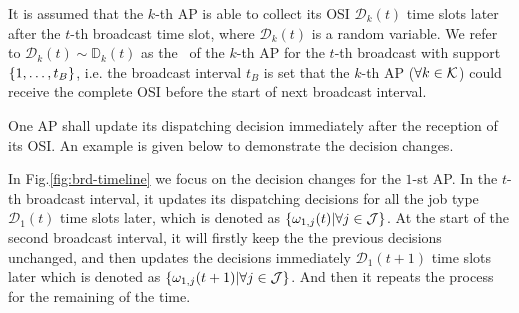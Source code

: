 It is assumed that the $k$-th AP is able to collect its OSI $\mathcal{D}_{k}(t)$ time slots later after the $t$-th broadcast time slot, where $\mathcal{D}_{k}(t)$ is a random variable.
We refer to $\mathcal{D}_{k}(t) \sim \mathbb{D}_{k}(t)$ as the \brlatency~of the $k$-th AP for the $t$-th broadcast with support $\{1,\dots,t_B\}$, i.e. the broadcast interval $t_B$ is set that the $k$-th AP ($\forall k\in\mathcal{K}$) could receive the complete OSI before the start of next broadcast interval.

One AP shall update its dispatching decision immediately after the reception of its OSI.
An example is given below to demonstrate the decision changes.
\begin{example}
    In Fig.\ref{fig:brd-timeline} we focus on the decision changes for the $1$-st AP.
    In the $t$-th broadcast interval, it updates its dispatching decisions for all the job type $\mathcal{D}_{1}(t)$ time slots later, which is denoted as $\{\omega_{1,j}(t) | \forall j\in\mathcal{J}\}$.
    At the start of the second broadcast interval, it will firstly keep the the previous decisions unchanged, and then updates the decisions immediately $\mathcal{D}_{1}(t+1)$ time slots later which is denoted as $\{\omega_{1,j}(t+1) | \forall j\in\mathcal{J}\}$.
    And then it repeats the process for the remaining of the time.
\end{example}

